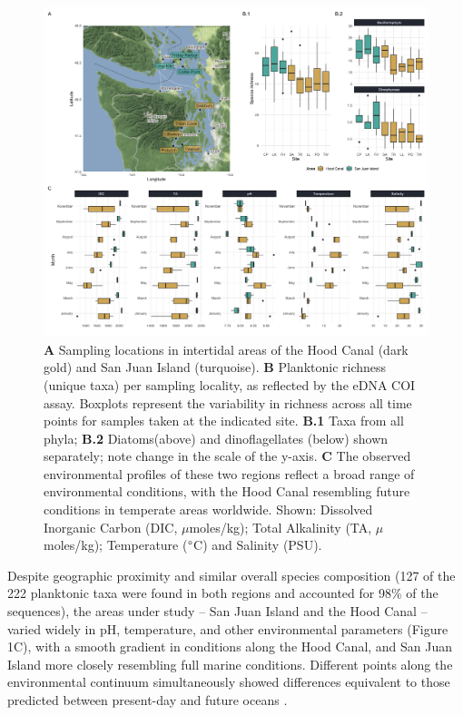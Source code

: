 \documentclass[11pt]{article}
\begin{document}
\begin{linenumbers}
\begin{figure}%
\centering
\includegraphics[width=1 \linewidth]{Figures_for_MS/Fig1.png}
\caption{\footnotesize {\textbf{A} Sampling locations in intertidal areas of the Hood Canal (dark gold) and San Juan Island (turquoise). \textbf{B} Planktonic richness (unique taxa) per sampling locality, as reflected by the eDNA COI assay. Boxplots represent the variability in richness across all time points for samples taken at the indicated site. \textbf{B.1} Taxa from all phyla; \textbf{B.2} Diatoms(above) and dinoflagellates (below) shown separately; note change in the scale of the y-axis. \textbf{C} The observed environmental profiles of these two regions reflect a broad range of environmental conditions, with the Hood Canal resembling future conditions in temperate areas worldwide. Shown: Dissolved Inorganic Carbon (DIC, $\mu$moles/kg); Total Alkalinity (TA, $\mu$moles/kg); Temperature ($\degree$C) and Salinity (PSU).}}
\label{fig:Fig1}
\end{figure}


Despite geographic proximity and similar overall species composition (127 of the 222 planktonic taxa were found in both regions and accounted for 98\% of the sequences), the areas under study -- San Juan Island and the Hood Canal -- varied widely in pH, temperature, and other environmental parameters (Figure 1C), with a smooth gradient in conditions along the Hood Canal, and San Juan Island more closely resembling full marine conditions. Different points along the environmental continuum simultaneously showed differences equivalent to those predicted between present-day and future oceans \cite{bopp2013multiple}.


\end{linenumbers}
\end{document}
